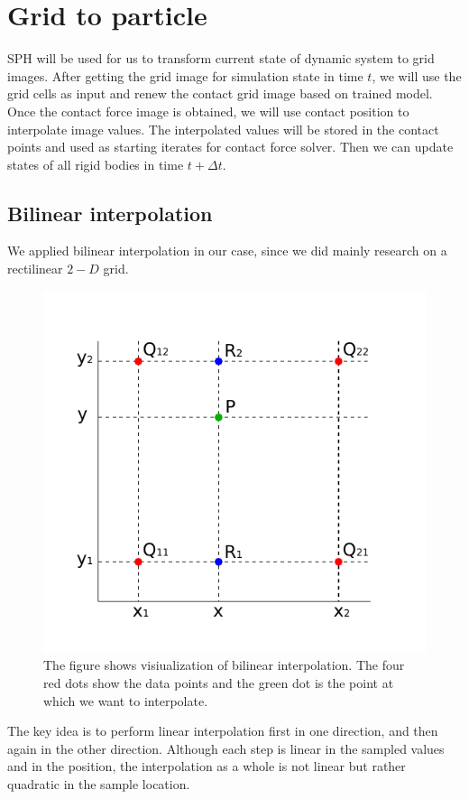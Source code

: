 \section{Grid to particle}
    SPH will be used for us to transform current state of dynamic system to grid images. After getting the grid image for simulation state in time $t$, we will use the grid cells as input and renew the contact grid image based on trained model. Once the contact force image is obtained, we will use contact position to interpolate image values. The interpolated values will be stored in the contact points and used as starting iterates for contact force solver. Then we can update states of all rigid bodies in time $t+\Delta{t}$.

    \subsection{Bilinear interpolation}
    We applied bilinear interpolation in our case, since we did mainly research on a rectilinear $2-D$ grid.
    \begin{figure}
        \centering
        \includegraphics[scale = 0.8]{Figures/inp}
        \caption{The figure shows visiualization of bilinear interpolation. The four red dots show the data points and the green dot is the point at which we want to interpolate.}
        \label{fig:1}
    \end{figure}
    The key idea is to perform linear interpolation first in one direction, and then again in the other direction. Although each step is linear in the sampled values and in the position, the interpolation as a whole is not linear but rather quadratic in the sample location. \\

